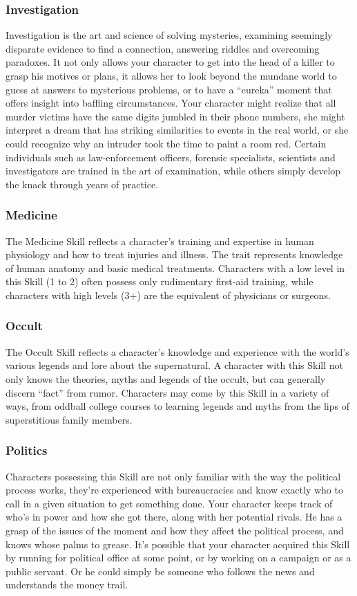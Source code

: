 \documentclass["../Misguided by Starlight.tex"]{subfiles}
\begin{document}
\subsubsection{Investigation}
Investigation is the art and science of solving mysteries, examining seemingly disparate evidence to find a connection, answering riddles and overcoming paradoxes. It not only allows your character to get into the head of a killer to grasp his motives or plans, it allows her to look beyond the mundane world to guess at answers to mysterious problems, or to have a “eureka” moment that offers insight into baffling circumstances. Your character might realize that all murder victims have the same digits jumbled in their phone numbers, she might interpret a dream that has striking similarities to events in the real world, or she could recognize why an intruder took the time to paint a room red. Certain individuals such as law-enforcement officers, forensic specialists, scientists and investigators are trained in the art of examination, while others simply develop the knack through years of practice.

\subsubsection{Medicine}
The Medicine Skill reflects a character’s training and expertise in human physiology and how to treat injuries and illness. The trait represents knowledge of human anatomy and basic medical treatments. Characters with a low level in this Skill (1 to 2) often possess only rudimentary first-aid training, while characters with high levels (3+) are the equivalent of physicians or surgeons.

\subsubsection{Occult}
The Occult Skill reflects a character’s knowledge and experience with the world’s various legends and lore about the supernatural. A character with this Skill not only knows the theories, myths and legends of the occult, but can generally discern “fact” from rumor. Characters may come by this Skill in a variety of ways, from oddball college courses to learning legends and myths from the lips of superstitious family members.

\subsubsection{Politics}
Characters possessing this Skill are not only familiar with the way the political process works, they’re experienced with bureaucracies and know exactly who to call in a given situation to get something done. Your character keeps track of who’s in power and how she got there, along with her potential rivals. He has a grasp of the issues of the moment and how they affect the political process, and knows whose palms to grease. It’s possible that your character acquired this Skill by running for political office at some point, or by working on a campaign or as a public servant. Or he could simply be someone who follows the news and understands the money trail.
\end{document}
